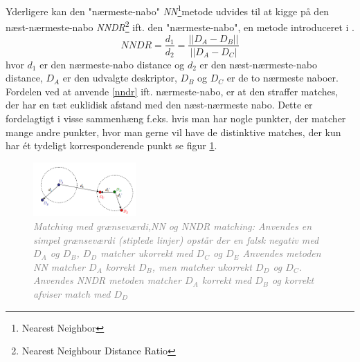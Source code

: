        \vspace{-2.5em}
\noindent
Yderligere kan den "nærmeste-nabo" \textit{NN}\footnote{Nearest Neighbor}metode udvides til at kigge på den næst-nærmeste-nabo \textit{NNDR}\footnote{Nearest Neighbour Distance Ratio} ift. den "nærmeste-nabo", en metode introduceret i \cite{eval}.
\begin{equation}
N\!N\!D\!R=\dfrac{d_1}{d_2}=\dfrac{||D_A-D_B||}{||D_A-D_C|}
\label{nndr}
\end{equation}
hvor $d_1$ er den nærmeste-nabo distance og $d_2$ er den næst-nærmeste-nabo distance, $D_A$ er den udvalgte deskriptor, $D_B$ og $D_C$ er de to nærmeste naboer. Fordelen ved at anvende \eqref{nndr} ift. nærmeste-nabo, er at den straffer matches, der har en tæt euklidisk afstand med den næst-nærmeste nabo. Dette er fordelagtigt i visse sammenhæng f.eks. hvis man har nogle punkter, der matcher mange andre punkter, hvor man gerne vil have de distinktive matches, der kun har ét tydeligt korresponderende punkt se figur \ref{fig:skift2}.
\begin{figure}[H]
    \centering
    \includegraphics[width=0.35\textwidth]{fig/23.png}
    \vspace{-0.5em}   
    \begin{center}
    \caption{\textcolor{gray}{\footnotesize \textit{
      Matching med grænseværdi,\textit{NN} og \textit{NNDR} matching:
       Anvendes en simpel grænseværdi (stiplede linjer)  opstår der en falsk negativ med $D_A$ og $D_B$, $D_D$ matcher ukorrekt med $D_C$ og $D_E$    
       Anvendes metoden NN matcher $D_A$ korrekt $ D_B$, men matcher ukorrekt $D_D$ og $D_C$. Anvendes NNDR metoden matcher $D_A$ korrekt med $D_B$ og korrekt afviser match med $D_D$
     \cite{book1}}}}
    \label{fig:skift2}
     \end{center}
  \end{figure}
       \vspace{-2.5em}
\noindent